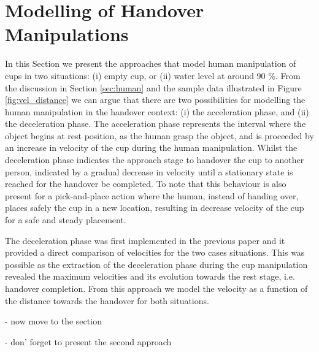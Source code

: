 \section{Modelling of Handover Manipulations}

In this Section we present the approaches that model human manipulation of cups in two situations: (i) empty cup, or (ii) water level at around 90 \%. From the discussion in Section \ref{sec:human} and the sample data illustrated in Figure \ref{fig:vel_distance} we can argue that there are two possibilities for modelling the human manipulation in the handover context: (i) the acceleration phase, and (ii) the deceleration phase. The acceleration phase represents the interval where the object begins at rest position, as the human grasp the object, and is proceeded by an increase in velocity of the cup during the human manipulation. Whilst the deceleration phase indicates the approach stage to handover the cup to another person, indicated by a gradual decrease in velocity until a stationary state is reached for the handover be completed.
To note that this behaviour is also present for a pick-and-place action \cite{flash_models_2013} where the human, instead of handing over, places safely the cup in a new location, resulting in decrease velocity of the cup for a safe and steady placement.  

The deceleration phase was first implemented in the previous paper \cite{duarte_human_2020} and it provided a direct comparison of velocities for the two cases situations. This was possible as the extraction of the deceleration phase during the cup manipulation revealed the maximum velocities and its evolution towards the rest stage, i.e. handover completion. From this approach we model the velocity as a function of the distance towards the handover for both situations. 

- now move to the section

- don' forget to present the second approach


